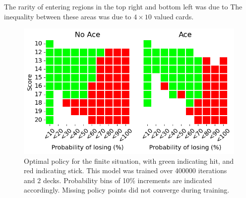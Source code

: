 The rarity of entering regions in the top right and bottom left was due to 
The inequality between these areas was due to \(4\times10\) valued cards.

\begin{figure}[ht]
    \centering
    \includegraphics[width=\singlefigure]{figures/finite_optimal_policy.png}
    \caption{Optimal policy for the finite situation, with green indicating hit, and red indicating stick. This model was trained over 400000 iterations and 2 decks. Probability bins of 10\% increments are indicated accordingly. Missing policy points did not converge during training.}
    \label{fig: Optimal policy - Finite} 
\end{figure}

